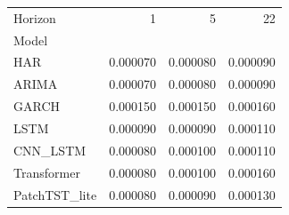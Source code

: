 \begin{tabular}{lrrr}
\toprule
Horizon & 1 & 5 & 22 \\
Model &  &  &  \\
\midrule
HAR & 0.000070 & 0.000080 & 0.000090 \\
ARIMA & 0.000070 & 0.000080 & 0.000090 \\
GARCH & 0.000150 & 0.000150 & 0.000160 \\
LSTM & 0.000090 & 0.000090 & 0.000110 \\
CNN_LSTM & 0.000080 & 0.000100 & 0.000110 \\
Transformer & 0.000080 & 0.000100 & 0.000160 \\
PatchTST_lite & 0.000080 & 0.000090 & 0.000130 \\
\bottomrule
\end{tabular}
